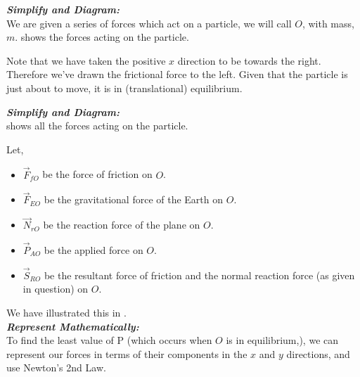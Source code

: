 \begin{subquestions}
\begin{subsubquestions}
\begin{subsubsubquestions}
\end{subsubsubquestions}

\end{subsubquestions}
	

\subquestion

\begin{subsubquestions}
	
	\subsubquestion
	
	\textbf{\textit{Simplify and Diagram:}} \\
	We are given a series of forces which act on a particle, we will call $O$, with mass, $m$.  shows the forces acting on the particle.
	
	Note that we have taken the positive $x$ direction to be towards the right. Therefore we've drawn the frictional force to the left. Given that the particle is just about to move, it is in (translational) equilibrium.\\
	
	\subsubquestion
	
	\textbf{\textit{Simplify and Diagram:}} \\
	 shows all the forces acting on the particle.
	
	Let,
	\begin{itemize}
		\item $\vec{F}_{fO}$ be the force of friction on $O$.
		\item $\vec{F}_{EO}$ be the gravitational force of the Earth on $O$.
		\item $\vec{N}_{rO}$ be the reaction force of the plane on $O$.
		\item $\vec{P}_{AO}$ be the applied force on $O$.
		\item $\vec{S}_{RO}$ be the resultant force of friction and the normal reaction force (as given in question) on $O$.
	\end{itemize}
	
	We have illustrated this in .\\
	
	
	
	\textbf{\textit{Represent Mathematically:}} \\
	To find the least value of P (which occurs when $O$ is in equilibrium,), we can represent our forces in terms of their components in the $x$ and $y$ directions, and use Newton's 2nd Law.
	

\end{subsubquestions}
\end{subquestions}
